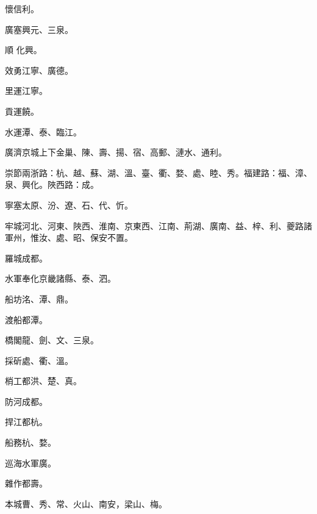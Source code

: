 \begin{pinyinscope}
 懷信利。



 廣塞興元、三泉。



 順
 化興。



 效勇江寧、廣德。



 里運江寧。



 貢運饒。



 水運潭、泰、臨江。



 廣濟京城上下金巢、陳、壽、揚、宿、高郵、漣水、通利。



 崇節兩浙路：杭、越、蘇、湖、溫、臺、衢、婺、處、睦、秀。福建路：福、漳、泉、興化。陜西路：成。



 寧塞太原、汾、遼、石、代、忻。



 牢城河北、河東、陜西、淮南、京東西、江南、荊湖、廣南、益、梓、利、夔路諸軍州，惟汝、處、昭、保安不置。



 羅城成都。



 水軍奉化京畿諸縣、泰、泗。



 船坊洺、潭、鼎。



 渡船都潭。



 橋閣龍、劍、文、三泉。



 採斫處、衢、溫。



 梢工都洪、楚、真。



 防河成都。



 捍江都杭。



 船務杭、婺。



 巡海水軍廣。



 雜作都壽。



 本城曹、秀、常、火山、南安，梁山、梅。




\end{pinyinscope}

